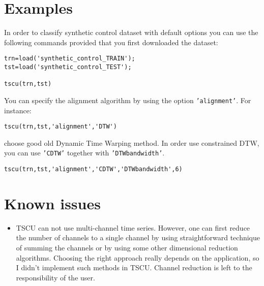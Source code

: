 \documentclass{article}
\begin{document}
\section{Examples}
In order to classify synthetic control dataset with default options you can use the following commands provided that you first downloaded the dataset:
\begin{verbatim}
trn=load('synthetic_control_TRAIN');
tst=load('synthetic_control_TEST');

tscu(trn,tst)
\end{verbatim}
You can specify the alignment algorithm by using the option \texttt{'alignment'}. For instance:
\begin{verbatim}
tscu(trn,tst,'alignment','DTW')
\end{verbatim}
choose good old Dynamic Time Warping method. In order use constrained DTW, you can use \texttt{'CDTW'} together with \texttt{'DTWbandwidth'}.
\begin{verbatim}
tscu(trn,tst,'alignment','CDTW','DTWbandwidth',6)
\end{verbatim}

\section{Known issues}
\begin{itemize}
\item TSCU can not use multi-channel time series. However, one can first reduce the number of channels to a single channel by using straightforward technique of summing the channels or by using some other dimensional reduction algorithms. Choosing the right approach really depends on the application, so I didn't implement such methods in TSCU. Channel reduction is left to the responsibility of the user.
\end{itemize}


\end{document}
